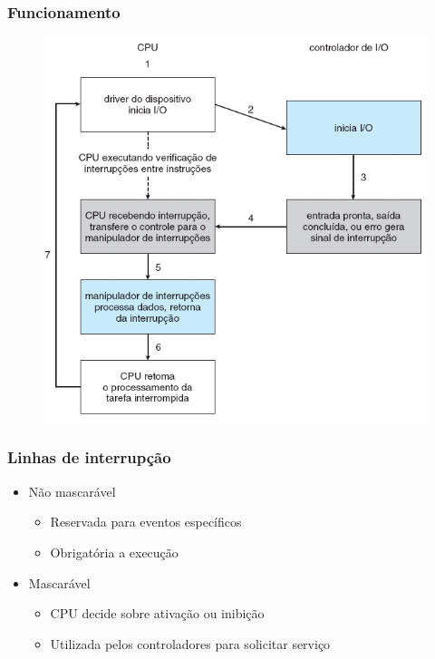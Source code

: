 \documentclass[aspectratio=169,
				xcolor=table]{beamer}
\begin{document}
	\begin{frame}
		\frametitle{Funcionamento}
		\begin{figure}[hbtp]
		\centering
		\includegraphics[height=.8\textheight, keepaspectratio]{../figs/cap10/interrupt.png}
		\end{figure}
		
	\end{frame}
	
	\begin{frame}
		\frametitle{Linhas de interrupção}
		\begin{itemize}
			\item Não mascarável
			\begin{itemize}
				\item Reservada para eventos específicos
				\item Obrigatória a execução
			\end{itemize}
			\vspace{1em}
			\item Mascarável
			\begin{itemize}
				\item CPU decide sobre ativação ou inibição
				\item Utilizada pelos controladores para solicitar serviço
			\end{itemize}
		\end{itemize}
	\end{frame}
	
\end{document}
